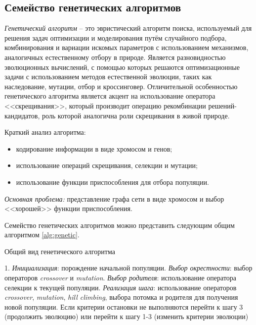 \clearpage

\subsection{Семейство генетических алгоритмов}\label{sec:genetic}
\emph{Генетический алгоритм} -- это эвристический алгоритм поиска, используемый для решения задач оптимизации 
и моделирования путём случайного подбора, комбинирования и вариации искомых параметров с использованием 
механизмов, аналогичных естественному отбору в природе. Является разновидностью эволюционных вычислений, 
с помощью которых решаются оптимизационные задачи с использованием методов естественной эволюции, таких 
как наследование, мутации, отбор и кроссинговер. Отличительной особенностью генетического алгоритма является 
акцент на использование оператора <<скрещивания>>, который производит операцию рекомбинации 
решений-кандидатов, роль которой аналогична роли скрещивания в живой природе.

Краткий анализ алгоритма:
\begin{itemize}
    \item кодирование информации в виде хромосом и генов;
    \item использование операций скрещивания, селекции и мутации;
    \item использование функции приспособления для отбора популяции.
\end{itemize}

\emph{Основная проблема:} представление графа сети в виде хромосом и выбор <<хорошей>> функции приспособления.

Семейство генетических алгоритмов можно представить следующим общим алгоритмом \ref{alg:genetic}.

\begin{algorithm}[ht!]
    \caption{Общий вид генетического алгоритма}
    1. \emph{Инициализация}: порождение начальной популяции. \emph{Выбор окрестности}: выбор операторов \emph{crossover} и \emph{mutation}. \emph{Выбор родителя}: использование оператора селекции к текущей популяции. \emph{Реализация шага}: использование операторов \emph{crossover}, 
        \emph{mutation}, \emph{hill climbing}, выбора потомка и родителя для получения 
        новой популяции. Если критерии остановки не выполняются перейти к шагу 3 (продолжить эволюцию) 
        или перейти к шагу 1-3 (изменить критерии эволюции)\;
    \label{alg:genetic}
\end{algorithm}

